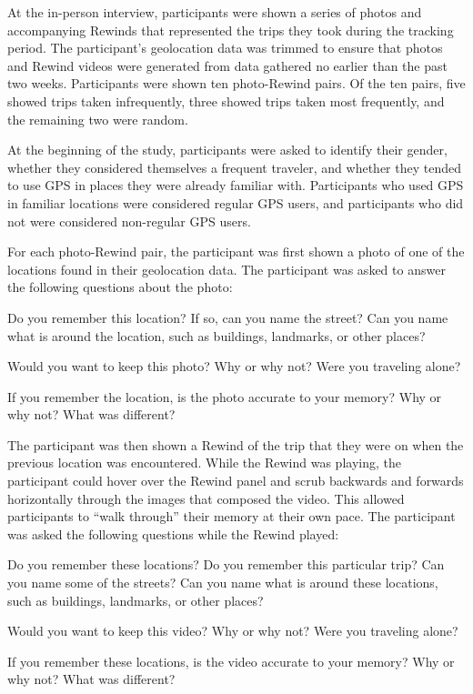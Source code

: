 \documentclass{sigchi}
\begin{document}
At the in-person interview, participants were shown a series of photos and accompanying Rewinds that represented the trips they took during the tracking period. The participant's geolocation data was trimmed to ensure that photos and Rewind videos were generated from data gathered no earlier than the past two weeks. Participants were shown ten photo-Rewind pairs.  Of the ten pairs, five showed trips taken infrequently, three showed trips taken most frequently, and the remaining two were random. 

At the beginning of the study, participants were asked to identify their gender, whether they considered themselves a frequent traveler, and whether they tended to use GPS in places they were already familiar with. Participants who used GPS in familiar locations were considered regular GPS users, and participants who did not were considered non-regular GPS users.

For each photo-Rewind pair, the participant was first shown a photo of one of the locations found in their geolocation data. The participant was asked to answer the following questions about the photo:

Do you remember this location? If so, can you name the street? Can you name what is around the location, such as buildings, landmarks, or other places?

Would you want to keep this photo? Why or why not? Were you traveling alone?

If you remember the location, is the photo accurate to your memory? Why or why not? What was different?

The participant was then shown a Rewind of the trip that they were on when the previous location was encountered. While the Rewind was playing, the participant could hover over the Rewind panel and scrub backwards and forwards horizontally through the images that composed the video. This allowed participants to ``walk through'' their memory at their own pace. The participant was asked the following questions while the Rewind played:

Do you remember these locations? Do you remember this particular trip? Can  you name some of the streets? Can you name what is around these locations, such as buildings, landmarks, or other places?

Would you want to keep this video? Why or why not? Were you traveling alone?

If you remember these locations, is the video accurate to your memory? Why or why not? What was different?
\end{document}
